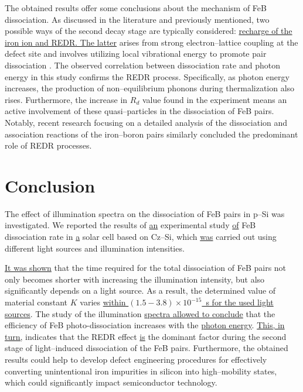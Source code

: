 \documentclass{WileyMSP-template}
\begin{document}
The obtained results offer some conclusions about the mechanism of FeB dissociation.
As discussed in the literature and previously mentioned, two possible ways of the second decay stage
are typically considered: \textcolor[rgb]{0.00,0.07,1.00}{\uline{recharge of the iron ion and REDR.
The latter}} arises from strong electron--lattice coupling at the defect site and involves utilizing local vibrational energy to promote pair dissociation
\cite{FeBAssJAP2014,Sun2021,Macdonald2004}.
The observed correlation between dissociation rate and photon energy in this study confirms the REDR process.
Specifically, as photon energy increases, the production of non--equilibrium phonons during thermalization also rises.
Furthermore, the increase in $R_d$ value found in the experiment means an active involvement of these quasi--particles in the dissociation of FeB pairs.
Notably, recent research \cite{Sun2021} focusing on a detailed analysis of the dissociation and association reactions of the iron--boron pairs similarly concluded the predominant role of REDR processes.



\section{Conclusion}\label{SecConsl}

The effect of illumination spectra on the dissociation of
FeB pairs in p--Si was investigated.
We reported the results of \textcolor[rgb]{0.00,0.07,1.00}{\uline{an}} experimental study \textcolor[rgb]{0.00,0.07,1.00}{\uline{of}} FeB dissociation rate in 
\textcolor[rgb]{0.00,0.07,1.00}{\uline{a}} solar cell based on Cz--Si,
which \textcolor[rgb]{0.00,0.07,1.00}{\uline{was}} carried out using different light sources and illumination intensities.


\textcolor[rgb]{0.00,0.07,1.00}{\uline{It was shown}} that the time required for the total dissociation of FeB pairs
not only becomes shorter with increasing the illumination intensity, but also significantly depends
on a light source.
As a result, the determined value of material constant $K$  varies \textcolor[rgb]{0.00,0.07,1.00}{\uline{within
$(1.5-3.8)\times10^{-15}$~s
for the used light sources}}.
The study of the illumination \textcolor[rgb]{0.00,0.07,1.00}{\uline{spectra allowed to conclude}} that the efficiency of FeB photo-dissociation increases with the 
\textcolor[rgb]{0.00,0.07,1.00}{\uline{photon energy}}.
\textcolor[rgb]{0.00,0.07,1.00}{\uline{This, in turn,}} indicates that
the REDR effect \textcolor[rgb]{0.00,0.07,1.00}{\uline{is}} the dominant factor during the second stage of light--induced dissociation of the FeB pairs.
Furthermore, the obtained results could help to develop defect engineering procedures
for effectively converting unintentional iron impurities in silicon into high--mobility states,
which could significantly impact semiconductor technology.
\end{document}
